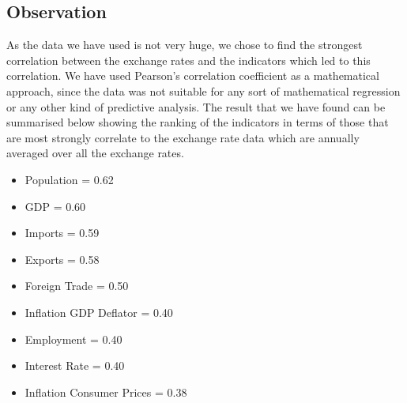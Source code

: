 \subsection{Observation}
As the data we have used is not very huge, we chose to find the strongest correlation between the exchange rates and the indicators which led to this correlation. We have used Pearson's correlation coefficient as a mathematical approach, since the data was not suitable for any sort of mathematical regression or any other kind of predictive analysis. The result that we have found can be summarised below showing the ranking of the indicators in terms of those that are most strongly correlate to  the exchange rate data which are annually averaged over all the exchange rates.
\newline
\begin{itemize}
\item Population = 0.62
\item GDP = 0.60
\item Imports = 0.59
\item Exports = 0.58
\item Foreign Trade = 0.50
\item Inflation GDP Deflator = 0.40
\item Employment = 0.40
\item Interest Rate = 0.40
\item Inflation Consumer Prices = 0.38
\end{itemize}

